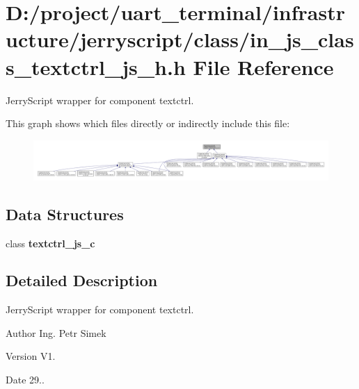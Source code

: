 \section{D\+:/project/uart\+\_\+terminal/infrastructure/jerryscript/class/in\+\_\+js\+\_\+class\+\_\+textctrl\+\_\+js\+\_\+h.h File Reference}
\label{in__js__class__textctrl__js__h_8h}


Jerry\+Script wrapper for component textctrl.  


This graph shows which files directly or indirectly include this file\+:\nopagebreak
\begin{figure}[H]
\begin{center}
\leavevmode
\includegraphics[width=350pt]{in__js__class__textctrl__js__h_8h__dep__incl}
\end{center}
\end{figure}
\subsection*{Data Structures}
\begin{DoxyCompactItemize}
\item 
class \textbf{ textctrl\+\_\+js\+\_\+c}
\end{DoxyCompactItemize}


\subsection{Detailed Description}
Jerry\+Script wrapper for component textctrl. 

\begin{DoxyAuthor}{Author}
Ing. Petr Simek 
\end{DoxyAuthor}
\begin{DoxyVersion}{Version}
V1. 
\end{DoxyVersion}
\begin{DoxyDate}{Date}
29.. 
\end{DoxyDate}
